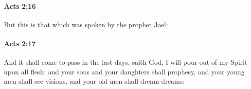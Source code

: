 		\paragraph{Acts 2:16} %
			\label{ACTS-2-16}

			But this is that which was spoken by the prophet Joel;

			\begin{framed}
			\scriptsize
				\begin{compactdesc}
					\item[SBLG] 
				\end{compactdesc}
			\end{framed}

		\paragraph{Acts 2:17} %
			\label{ACTS-2-17}

			And it shall come to pass in the last days, saith God, I will pour out of my Spirit upon all flesh: and your sons and your daughters shall prophesy, and your young men shall see visions, and your old men shall dream dreams:

